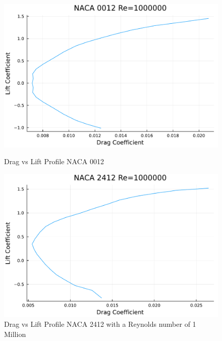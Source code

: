 \documentclass{article}
\begin{document}
\begin{figure}[h]
    \centering
\begin{minipage}[b]{0.32\textwidth}
\centering
\includegraphics[width=\textwidth]{NACA 0012 Re=1000000_Drag_vs_Lift_Coefficent_Plot.pdf}
\caption{\label{fig:NACA 0012 Lift Drag}Drag vs Lift Profile NACA 0012}
\end{minipage}
\begin{minipage}[b]{0.32\textwidth}
\centering
\includegraphics[width=\textwidth]{NACA 2412 Re=1000000_Drag_vs_Lift_Coefficent_Plot.pdf}
\caption{\label{fig:NACA 2412 Lift Drag}Drag vs Lift Profile NACA 2412 with a Reynolds number of 1 Million}
\end{minipage}
\begin{minipage}[b]{0.32\textwidth}
\centering

\end{minipage}
\end{figure}
\end{document}
